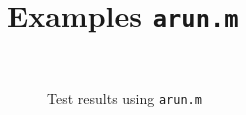 \chapter{Examples \texttt{arun.m}}\label{sec:mex}


\begin{figure}[htbp]
\centering
\fontsize{8}{0}\selectfont
\setlength{}
\subfloat{
}
\hfill
\setlength{}
\subfloat{
}
\\
\fontsize{8}{0}\selectfont
\setlength{}
\subfloat{
}
\hfill
\fontsize{8}{0}\selectfont
\setlength{}
\subfloat{
}
\caption{Test results using \texttt{arun.m}}
\label{fig:tests}
\end{figure}